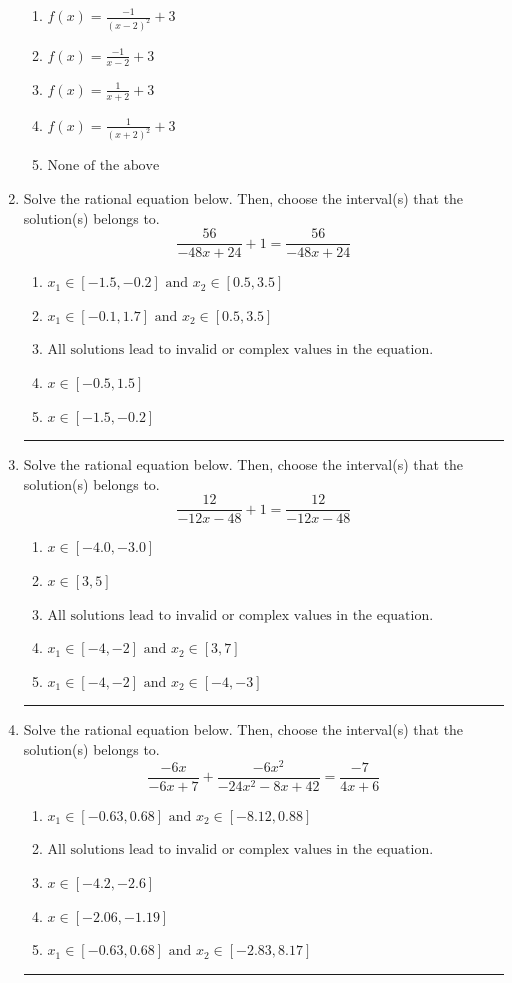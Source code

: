 \documentclass[14pt]{extbook}
\newcommand{\litem}[1]{\item#1\hspace*{-1cm}\rule{\textwidth}{0.4pt}}
\begin{document}
\begin{enumerate}
{\begin{center}
\end{center}
\begin{enumerate}[label=\Alph*.]
\item \( f(x) = \frac{-1}{(x - 2)^2} + 3 \)
\item \( f(x) = \frac{-1}{x - 2} + 3 \)
\item \( f(x) = \frac{1}{x + 2} + 3 \)
\item \( f(x) = \frac{1}{(x + 2)^2} + 3 \)
\item \( \text{None of the above} \)

\end{enumerate} }
\litem{
Solve the rational equation below. Then, choose the interval(s) that the solution(s) belongs to.\[ \frac{56}{-48x + 24} + 1 = \frac{56}{-48x + 24} \]\begin{enumerate}[label=\Alph*.]
\item \( x_1 \in [-1.5, -0.2] \text{ and } x_2 \in [0.5,3.5] \)
\item \( x_1 \in [-0.1, 1.7] \text{ and } x_2 \in [0.5,3.5] \)
\item \( \text{All solutions lead to invalid or complex values in the equation.} \)
\item \( x \in [-0.5,1.5] \)
\item \( x \in [-1.5,-0.2] \)

\end{enumerate} }
\litem{
Solve the rational equation below. Then, choose the interval(s) that the solution(s) belongs to.\[ \frac{12}{-12x -48} + 1 = \frac{12}{-12x -48} \]\begin{enumerate}[label=\Alph*.]
\item \( x \in [-4.0,-3.0] \)
\item \( x \in [3,5] \)
\item \( \text{All solutions lead to invalid or complex values in the equation.} \)
\item \( x_1 \in [-4, -2] \text{ and } x_2 \in [3,7] \)
\item \( x_1 \in [-4, -2] \text{ and } x_2 \in [-4,-3] \)

\end{enumerate} }
\litem{
Solve the rational equation below. Then, choose the interval(s) that the solution(s) belongs to.\[ \frac{-6x}{-6x + 7} + \frac{-6x^{2}}{-24x^{2} -8 x + 42} = \frac{-7}{4x + 6} \]\begin{enumerate}[label=\Alph*.]
\item \( x_1 \in [-0.63, 0.68] \text{ and } x_2 \in [-8.12,0.88] \)
\item \( \text{All solutions lead to invalid or complex values in the equation.} \)
\item \( x \in [-4.2,-2.6] \)
\item \( x \in [-2.06,-1.19] \)
\item \( x_1 \in [-0.63, 0.68] \text{ and } x_2 \in [-2.83,8.17] \)


\end{enumerate}}
\end{enumerate}
\end{document}
